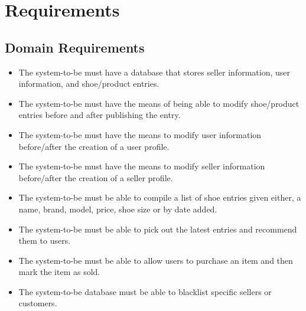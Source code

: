 \section{Requirements}
\subsection{Domain Requirements}
\begin{itemize}
  \item The system-to-be must have a database that stores seller information, user information, and shoe/product entries.
  \item The system-to-be must have the means of being able to modify shoe/product entries before and after publishing the entry.
  \item The system-to-be must have the means to modify user information before/after the creation of a user profile.
  \item The system-to-be must have the means to modify seller information before/after the creation of a seller profile.
  \item The system-to-be must be able to compile a list of shoe entries given either, a name, brand, model, price, shoe size or by date added.
  \item The system-to-be must be able to pick out the latest entries and recommend them to users.
  \item The system-to-be must be able to allow users to purchase an item and then mark the item as sold.
  \item The system-to-be database must be able to blacklist specific sellers or customers.
\end{itemize}
